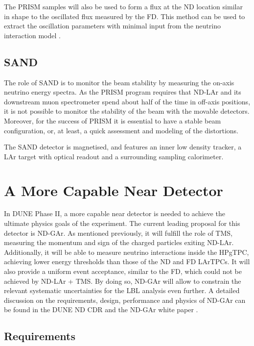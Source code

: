 The PRISM samples will also be used to form a flux at the ND location similar in shape to the oscillated flux measured by the FD. This method can be used to extract the oscillation parameters with minimal input from the neutrino interaction model \cite{Hasnip2023}.

\subsection{SAND}

The role of SAND is to monitor the beam stability by measuring the on-axis neutrino energy spectra. As the PRISM program requires that ND-LAr and its downstream muon spectrometer spend about half of the time in off-axis positions, it is not possible to monitor the stability of the beam with the movable detectors. Moreover, for the success of PRISM it is essential to have a stable beam configuration, or, at least, a quick assessment and modeling of the distortions.

The SAND detector is magnetised, and features an inner low density tracker, a LAr target with optical readout and a surrounding sampling calorimeter.

\section{A More Capable Near Detector}\label{sec:mcnd}

In DUNE Phase II, a more capable near detector is needed to achieve the ultimate physics goals of the experiment. The current leading proposal for this detector is ND-GAr. As mentioned previously, it will fulfill the role of TMS, measuring the momentum and sign of the charged particles exiting ND-LAr. Additionally, it will be able to measure neutrino interactions inside the HPgTPC, achieving lower energy thresholds than those of the ND and FD LArTPCs. It will also provide a uniform event acceptance, similar to the FD, which could not be achieved by ND-LAr + TMS. By doing so, ND-GAr will allow to constrain the relevant systematic uncertainties for the LBL analysis even further. A detailed discussion on the requirements, design, performance and physics of ND-GAr can be found in the DUNE ND CDR \cite{DUNE2021NDCDR} and the ND-GAr white paper \cite{DUNE2022GArWhite}.

\subsection{Requirements}

